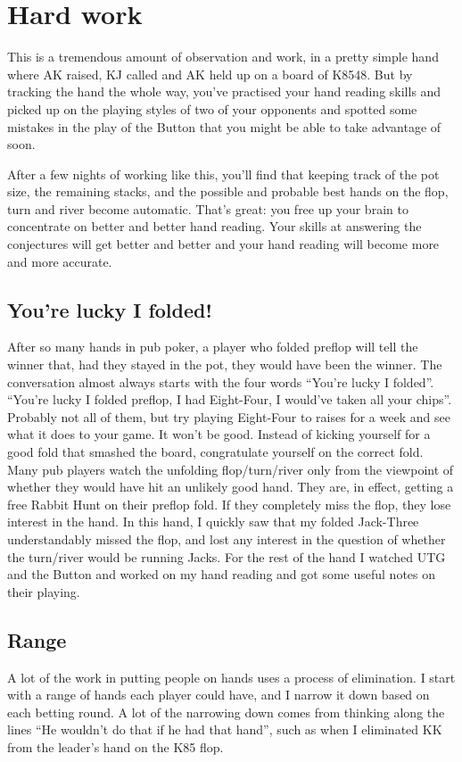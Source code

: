 \section{Hard work}

This is a tremendous amount of observation and work, in a pretty simple
hand where AK raised, KJ called and AK held up on a board of K8548. But
by tracking the hand the whole way, you've practised your hand reading skills
and picked up on the playing styles of two of your opponents and spotted
some mistakes in the play of the Button that you might be able to
take advantage of soon.

After a few nights of working like this, you'll find that keeping track
of the pot size, the remaining stacks, and the possible and probable
best hands on the flop, turn and river become automatic. That's great: you
free up your brain to concentrate on better and better hand reading. Your
skills at answering the conjectures will get better and better and your
hand reading will become more and more accurate.

\subsection*{You're lucky I folded!}

After so many hands in pub poker, a player who folded preflop will
tell the winner that, had they stayed in the pot, they would have been
the winner. The conversation almost always starts with the four words
``You're lucky I folded''. ``You're lucky I folded preflop, I had
Eight-Four, I would've taken all your chips''. Probably not all of
them, but try playing Eight-Four to raises for a week and see what it
does to your game. It won't be good. Instead of kicking yourself for a
good fold that smashed the board, congratulate yourself on the correct
fold. Many pub players watch the unfolding
flop/turn/river only from the viewpoint of whether they would have hit
an unlikely good hand. They are, in effect, getting a free Rabbit Hunt
on their preflop fold. If they completely miss the flop, they lose
interest in the hand. In this hand, I quickly saw that my folded
Jack-Three understandably missed the flop, and lost any interest in
the question of whether the turn/river would be running Jacks. For the
rest of the hand I watched UTG and the Button and worked on my hand
reading and got some useful notes on their playing.

\subsection*{Range}
A lot of the work in putting people on hands uses a process
of elimination. I start with a range of hands each player could have,
and I narrow it down based on each betting round. A lot of the narrowing
down comes from thinking along the lines ``He wouldn't do that if he
had that hand'', such as when I eliminated KK from the leader's hand
on the K85 flop.

